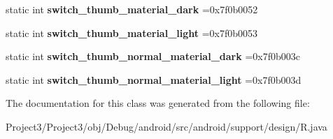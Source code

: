 \begin{DoxyCompactItemize}
\item 
\mbox{\label{classandroid_1_1support_1_1design_1_1R_1_1color_a3379a8b91816a2a9fc4deb0447ce7312}} 
static int {\bfseries switch\+\_\+thumb\+\_\+material\+\_\+dark} =0x7f0b0052
\item 
\mbox{\label{classandroid_1_1support_1_1design_1_1R_1_1color_ae22e1c46a365f93bb442f4d0c6223dfe}} 
static int {\bfseries switch\+\_\+thumb\+\_\+material\+\_\+light} =0x7f0b0053
\item 
\mbox{\label{classandroid_1_1support_1_1design_1_1R_1_1color_a5578974d77ae7af55f9156f17a849e84}} 
static int {\bfseries switch\+\_\+thumb\+\_\+normal\+\_\+material\+\_\+dark} =0x7f0b003c
\item 
\mbox{\label{classandroid_1_1support_1_1design_1_1R_1_1color_ad407ce3ae95e76072de2580470e44086}} 
static int {\bfseries switch\+\_\+thumb\+\_\+normal\+\_\+material\+\_\+light} =0x7f0b003d
\end{DoxyCompactItemize}


The documentation for this class was generated from the following file\+:\begin{DoxyCompactItemize}
\item 
Project3/\+Project3/obj/\+Debug/android/src/android/support/design/R.\+java\end{DoxyCompactItemize}
